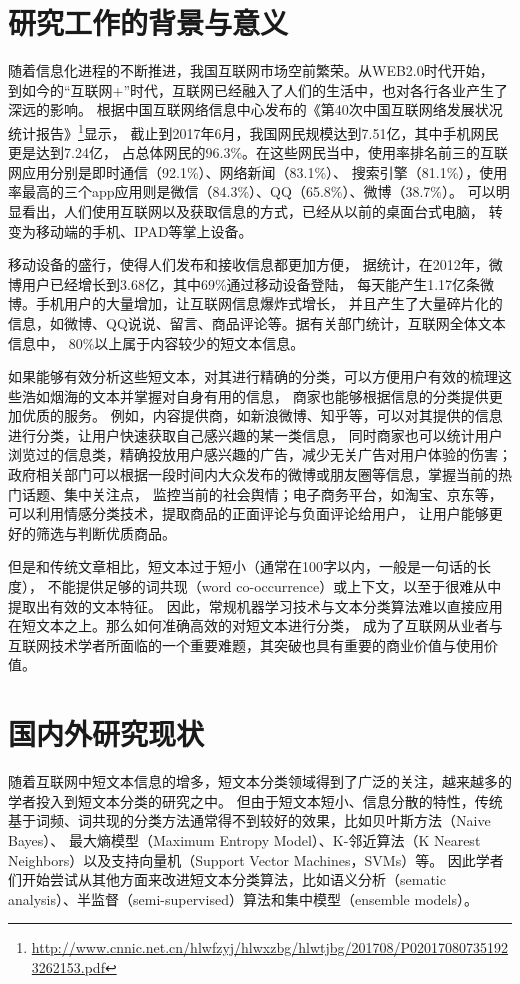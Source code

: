 \thesischapterexordium
\section{研究工作的背景与意义}

随着信息化进程的不断推进，我国互联网市场空前繁荣。从WEB2.0时代开始，
到如今的“互联网+”时代，互联网已经融入了人们的生活中，也对各行各业产生了深远的影响。
根据中国互联网络信息中心发布的《第40次中国互联网络发展状况统计报告》\footnote{\url{http://www.cnnic.net.cn/hlwfzyj/hlwxzbg/hlwtjbg/201708/P020170807351923262153.pdf}}显示，
截止到2017年6月，我国网民规模达到7.51亿，其中手机网民更是达到7.24亿，
占总体网民的96.3\%。在这些网民当中，使用率排名前三的互联网应用分别是即时通信（92.1\%）、网络新闻（83.1\%）、
搜索引擎（81.1\%），使用率最高的三个app应用则是微信（84.3\%）、QQ（65.8\%）、微博（38.7\%）。
可以明显看出，人们使用互联网以及获取信息的方式，已经从以前的桌面台式电脑，
转变为移动端的手机、IPAD等掌上设备。

移动设备的盛行，使得人们发布和接收信息都更加方便，
据统计，在2012年，微博用户已经增长到3.68亿，其中69\%通过移动设备登陆，
每天能产生1.17亿条微博。手机用户的大量增加，让互联网信息爆炸式增长，
并且产生了大量碎片化的信息，如微博、QQ说说、留言、商品评论等。据有关部门统计，互联网全体文本信息中，
80\%以上属于内容较少的短文本信息。

如果能够有效分析这些短文本，对其进行精确的分类，可以方便用户有效的梳理这些浩如烟海的文本并掌握对自身有用的信息，
商家也能够根据信息的分类提供更加优质的服务。
例如，内容提供商，如新浪微博、知乎等，可以对其提供的信息进行分类，让用户快速获取自己感兴趣的某一类信息，
同时商家也可以统计用户浏览过的信息类，精确投放用户感兴趣的广告，减少无关广告对用户体验的伤害；
政府相关部门可以根据一段时间内大众发布的微博或朋友圈等信息，掌握当前的热门话题、集中关注点，
监控当前的社会舆情；电子商务平台，如淘宝、京东等，可以利用情感分类技术，提取商品的正面评论与负面评论给用户，
让用户能够更好的筛选与判断优质商品。

但是和传统文章相比，短文本过于短小（通常在100字以内，一般是一句话的长度），
不能提供足够的词共现（word co-occurrence）或上下文，以至于很难从中提取出有效的文本特征。
因此，常规机器学习技术与文本分类算法难以直接应用在短文本之上。那么如何准确高效的对短文本进行分类，
成为了互联网从业者与互联网技术学者所面临的一个重要难题，其突破也具有重要的商业价值与使用价值。

\section{国内外研究现状}
\label{research_status}
随着互联网中短文本信息的增多，短文本分类领域得到了广泛的关注，越来越多的学者投入到短文本分类的研究之中。
但由于短文本短小、信息分散的特性，传统基于词频、词共现的分类方法通常得不到较好的效果，比如贝叶斯方法（Naive Bayes）、
最大熵模型（Maximum Entropy Model）、K-邻近算法（K Nearest Neighbors）以及支持向量机（Support Vector Machines，SVMs）等。
因此学者们开始尝试从其他方面来改进短文本分类算法，比如语义分析（sematic analysis）、半监督（semi-supervised）算法和集中模型（ensemble models）。

